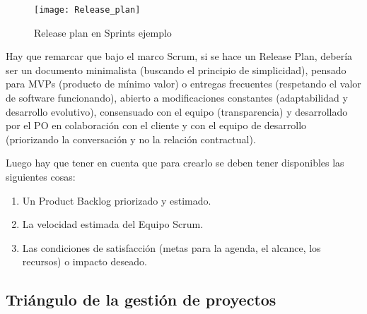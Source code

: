 \begin{figure}[h]
  \centering
  \texttt{[image: Release\_plan]}
  \caption{Release plan en Sprints ejemplo}
  \centering
  \label{fig:Release_plan} %
\end{figure}
\FloatBarrier %

Hay que remarcar que bajo el marco Scrum, si se hace un Release Plan, debería ser un documento minimalista (buscando el principio de simplicidad), pensado para MVPs (producto de mínimo valor) o entregas frecuentes (respetando el valor de software funcionando), abierto a modificaciones constantes (adaptabilidad y desarrollo evolutivo), consensuado con el equipo (transparencia) y desarrollado por el PO en colaboración con el cliente y con el equipo de desarrollo (priorizando la conversación y no la relación contractual).

Luego hay que tener en cuenta que para crearlo se deben tener disponibles las siguientes cosas:

\begin{enumerate}
\item Un Product Backlog priorizado y estimado.
\item La velocidad estimada del Equipo Scrum.
\item Las condiciones de satisfacción (metas para la agenda, el alcance, los recursos) o impacto deseado.
\end{enumerate}

\subsection{Triángulo de la gestión de proyectos}

